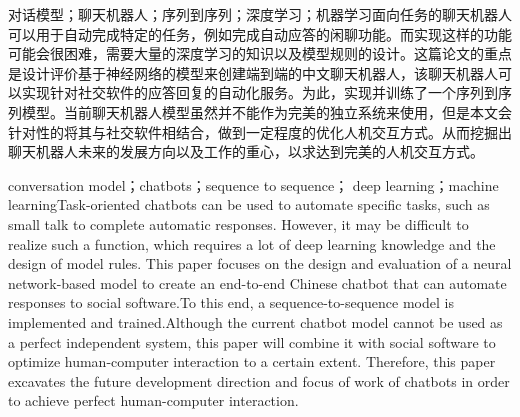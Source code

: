 \begin{chineseabstract}
    {对话模型；聊天机器人；序列到序列；深度学习；机器学习}面向任务的聊天机器人可以用于自动完成特定的任务，例如完成自动应答的闲聊功能。而实现这样的功能可能会很困难，需要大量的深度学习的知识以及模型规则的设计。这篇论文的重点是设计评价基于神经网络的模型来创建端到端的中文聊天机器人，该聊天机器人可以实现针对社交软件的应答回复的自动化服务。为此，实现并训练了一个序列到序列模型。当前聊天机器人模型虽然并不能作为完美的独立系统来使用，但是本文会针对性的将其与社交软件相结合，做到一定程度的优化人机交互方式。从而挖掘出聊天机器人未来的发展方向以及工作的重心，以求达到完美的人机交互方式。
\end{chineseabstract}
\begin{englishabstract}
    {conversation model；chatbots；sequence to sequence；
    deep learning；machine learning}Task-oriented chatbots can be used to automate specific tasks, such as small talk to complete automatic responses. However, it may be difficult to realize such a function, which requires a lot of deep learning knowledge and the design of model rules. This paper focuses on the design and evaluation of a neural network-based model to create an end-to-end Chinese chatbot that can automate responses to social software.To this end, a sequence-to-sequence model is implemented and trained.Although the current chatbot model cannot be used as a perfect independent system, this paper will combine it with social software to optimize human-computer interaction to a certain extent. Therefore, this paper excavates the future development direction and focus of work of chatbots in order to achieve perfect human-computer interaction.
\end{englishabstract}